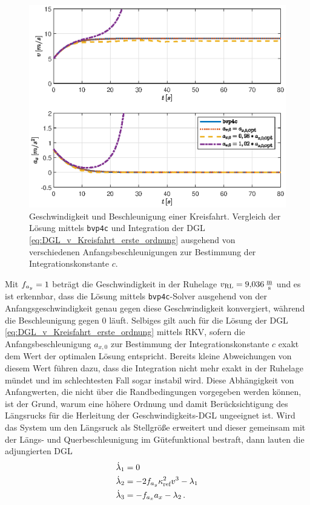 \begin{figure}[h] 
	\centering
	\includegraphics[width=0.87\linewidth]{./Bilder/Ergebnisse/Kreisfahrt/Ohne_Querdynamik/va_bvp4c_vs_odesol.eps}
	\caption{Geschwindigkeit und Beschleunigung einer Kreisfahrt. Vergleich der Lösung mittels \texttt{bvp4c} und Integration der \gls{DGL} \eqref{eq:DGL_v_Kreisfahrt_erste_ordnung} ausgehend von verschiedenen Anfangsbeschleunigungen zur Bestimmung der Integrationskonstante $c$.}
	\label{fig:va_bvp4c_vs_odesol}
\end{figure} 
Mit $f_{a_y} = 1$ beträgt die Geschwindigkeit in der Ruhelage $v_{\textrm{RL}} = 9{,}036\,\mathrm{\frac{\mathrm{m}}{\mathrm{s}}}$ und es ist erkennbar, dass die Lösung mittels \texttt{bvp4c}-Solver ausgehend von der Anfangsgeschwindigkeit genau gegen diese Geschwindigkeit konvergiert, während die Beschleunigung gegen 0 läuft. Selbiges gilt auch für die Lösung der \gls{DGL} \eqref{eq:DGL_v_Kreisfahrt_erste_ordnung} mittels \gls{RKV}, sofern die Anfangsbeschleunigung $a_{x,0}$ zur Bestimmung der Integrationskonstante $c$ exakt dem Wert der optimalen Lösung entspricht. Bereits kleine Abweichungen von diesem Wert führen dazu, dass die Integration nicht mehr exakt in der Ruhelage mündet und im schlechtesten Fall sogar instabil wird. Diese Abhängigkeit von Anfangwerten, die nicht über die Randbedingungen vorgegeben werden können, ist der Grund, warum eine höhere Ordnung und damit Berücksichtigung des Längsrucks für die Herleitung der Geschwindigkeits-\gls{DGL} ungeeignet ist. Wird das System um den Längsruck als Stellgröße erweitert und dieser gemeinsam mit der Längs- und Querbeschleunigung im Gütefunktional bestraft, dann lauten die adjungierten \gls{DGL}
\begin{align}
\dot{\lambda}_1 &= 0 \\
\dot{\lambda}_2 &= -2f_{a_y} \kappa_{\textrm{ref}}^2v^3 - \lambda_1 \\
\dot{\lambda}_3 &= -f_{a_x} a_x - \lambda_2\,.
\end{align}
